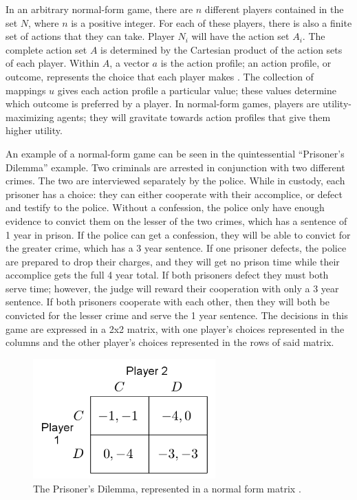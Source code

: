 In an arbitrary normal-form game, there are $n$ different players contained in the set $N$, where $n$ is a positive integer. For each of these players, there is also a finite set of actions that they can take. Player $N_i$ will have the action set $A_i$. The complete action set $A$ is determined by the Cartesian product of the action sets of each player. Within $A$, a vector $a$ is the action profile; an action profile, or outcome, represents the choice that each player makes \cite{osbo94}. The collection of mappings $u$ gives each action profile a particular value; these values determine which outcome is preferred by a player. In normal-form games, players are utility-maximizing agents; they will gravitate towards action profiles that give them higher utility.\\

\begin{exmp}
  An example of a normal-form game can be seen in the quintessential ``Prisoner's Dilemma'' example. Two criminals are arrested in conjunction with two different crimes. The two are interviewed separately by the police. While in custody, each prisoner has a choice: they can either cooperate with their accomplice, or defect and testify to the police. Without a confession, the police only have enough evidence to convict them on the lesser of the two crimes, which has a sentence of 1 year in prison. If the police can get a confession, they will be able to convict for the greater crime, which has a 3 year sentence. If one prisoner defects, the police are prepared to drop their charges, and they will get no prison time while their accomplice gets the full 4 year total. If both prisoners defect they must both serve time; however, the judge will reward their cooperation with only a 3 year sentence. If both prisoners cooperate with each other, then they will both be convicted for the lesser crime and serve the 1 year sentence. The decisions in this game are expressed in a 2x2 matrix, with one player's choices represented in the columns and the other player's choices represented in the rows of said matrix.

\begin{figure}[H]
  \centering
  \includegraphics[width=7cm]{figures/ExampleGrid.png}
  \caption{The Prisoner's Dilemma, represented in a normal form matrix \cite{shoh09}.}
  \label{fig:prisoner}
\end{figure}

\end{exmp}

